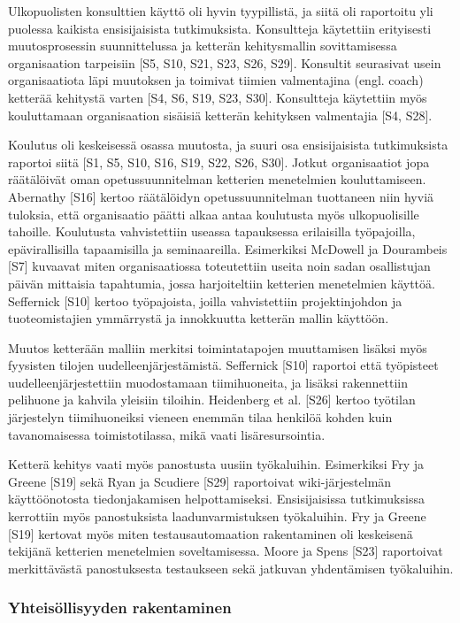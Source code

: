 Ulkopuolisten konsulttien käyttö oli hyvin tyypillistä, ja siitä oli raportoitu
yli puolessa kaikista ensisijaisista tutkimuksista. Konsultteja käytettiin
erityisesti muutosprosessin suunnittelussa ja ketterän kehitysmallin
sovittamisessa organisaation tarpeisiin [S5, S10, S21, S23, S26, S29]. Konsultit
seurasivat usein organisaatiota läpi muutoksen ja toimivat tiimien valmentajina
(engl. coach) ketterää kehitystä varten [S4, S6, S19, S23, S30]. Konsultteja
käytettiin myös kouluttamaan organisaation sisäisiä ketterän kehityksen
valmentajia [S4, S28].

Koulutus oli keskeisessä osassa muutosta, ja suuri osa ensisijaisista
tutkimuksista raportoi siitä [S1, S5, S10, S16, S19, S22, S26, S30]. Jotkut
organisaatiot jopa räätälöivät oman opetussuunnitelman ketterien menetelmien
kouluttamiseen. Abernathy [S16] kertoo räätälöidyn opetussuunnitelman tuottaneen
niin hyviä tuloksia, että organisaatio päätti alkaa antaa koulutusta myös
ulkopuolisille tahoille. Koulutusta vahvistettiin useassa tapauksessa
erilaisilla työpajoilla, epävirallisilla tapaamisilla ja seminaareilla.
Esimerkiksi McDowell ja Dourambeis [S7] kuvaavat miten organisaatiossa
toteutettiin useita noin sadan osallistujan päivän mittaisia tapahtumia, jossa
harjoiteltiin ketterien menetelmien käyttöä. Seffernick [S10] kertoo
työpajoista, joilla vahvistettiin projektinjohdon ja tuoteomistajien ymmärrystä
ja innokkuutta ketterän mallin käyttöön.

Muutos ketterään malliin merkitsi toimintatapojen muuttamisen lisäksi myös
fyysisten tilojen uudelleenjärjestämistä. Seffernick [S10] raportoi että
työpisteet uudelleenjärjestettiin muodostamaan tiimihuoneita, ja lisäksi
rakennettiin pelihuone ja kahvila yleisiin tiloihin. Heidenberg et al. [S26]
kertoo työtilan järjestelyn tiimihuoneiksi vieneen enemmän tilaa henkilöä kohden
kuin tavanomaisessa toimistotilassa, mikä vaati lisäresursointia.

Ketterä kehitys vaati myös panostusta uusiin työkaluihin. Esimerkiksi Fry ja
Greene [S19] sekä Ryan ja Scudiere [S29] raportoivat wiki-järjestelmän
käyttöönotosta tiedonjakamisen helpottamiseksi. Ensisijaisissa tutkimuksissa
kerrottiin myös panostuksista laadunvarmistuksen työkaluihin. Fry ja Greene
[S19] kertovat myös miten testausautomaation rakentaminen oli keskeisenä
tekijänä ketterien menetelmien soveltamisessa. Moore ja Spens [S23] raportoivat
merkittävästä panostuksesta testaukseen sekä jatkuvan yhdentämisen työkaluihin.

\subsubsection{Yhteisöllisyyden rakentaminen}

